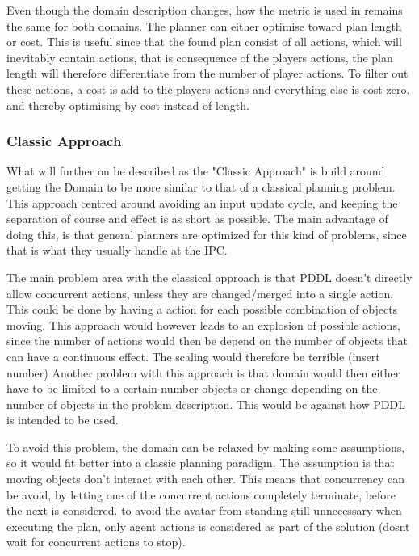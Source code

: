 
		
		Even though the domain description changes, how the metric is used in remains the same for both domains. The planner can either optimise toward plan length or cost. This is useful since that the found plan consist of all actions, which will inevitably contain actions, that is consequence of the players actions, the plan length will therefore differentiate from the number of player actions. To filter out these actions, a cost is add to the players actions and everything else is cost zero. and thereby optimising by cost instead of length.
	
		
		\subsubsection{Classic Approach}
		What will further on be described as the "Classic Approach" is build around getting the Domain to be more similar to that of a classical planning problem. 
		This approach centred around avoiding an input update cycle, and keeping the separation of course and effect is as short as possible. The main advantage of doing this, is that general planners are optimized for this kind of problems, since that is what they usually handle at the IPC.
		
		The main problem area with the classical approach is that PDDL doesn't directly allow concurrent actions, unless they are changed/merged into a single action. This could be done by having a action for each possible combination of objects moving. This approach would however leads to an explosion of possible actions, since the number of actions would then be depend on the number of objects that can have a continuous effect. The scaling would therefore be terrible (insert number)	
		Another problem with this approach is that domain would then either have to be limited to a certain number objects or change depending on the number of objects in the problem description. This would be against how PDDL is intended to be used. 
		
		
		To avoid this problem, the domain can be relaxed by making some assumptions, so it would fit better into a classic planning paradigm. The assumption is that moving objects don't interact with each other. This means that concurrency can be avoid, by letting one of the concurrent actions completely terminate, before the next is considered. to avoid the avatar from standing still unnecessary when executing the plan, only agent actions is considered as part of the solution (dosnt wait for concurrent actions to stop).
		
